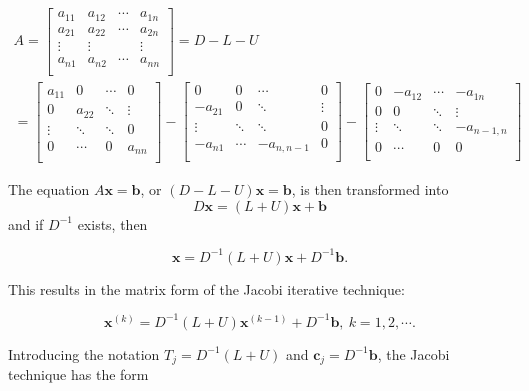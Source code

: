 \documentclass[preprint,12pt]{elsarticle}
\begin{document}
$$
\begin{array}{l}
A =\begin{bmatrix}
    a_{11} & a_{12} & \cdots & a_{1n} \\
    a_{21} & a_{22} & \cdots & a_{2n} \\
    \vdots & \vdots &  & \vdots \\
    a_{n1} & a_{n2} & \cdots & a_{nn} \\
  \end{bmatrix} =D-L-U\\
=\begin{bmatrix}
    a_{11} &0 & \cdots & 0 \\
    0 & a_{22} & \ddots & \vdots \\
    \vdots & \ddots & \ddots & 0 \\
   0 & \cdots & 0 & a_{nn} \\
  \end{bmatrix}-
  \begin{bmatrix}
    0 & 0 & \cdots & 0 \\
    -a_{21} & 0 & \ddots & \vdots \\
    \vdots & \ddots & \ddots & 0\\
    -a_{n1} &\cdots &  -a_{n,n-1} & 0 \\
  \end{bmatrix}
  -\begin{bmatrix}
    0 & -a_{12} & \cdots & -a_{1n} \\
    0 & 0 & \ddots &\vdots \\
    \vdots & \ddots & \ddots &  -a_{n-1,n} \\
    0 & \cdots & 0& 0 \\
  \end{bmatrix}
\end{array}
$$

The equation $A\mathbf{x} = \mathbf{b}$, or $(D - L - U)\mathbf{x} = \mathbf{b}$, is then transformed into \[D\mathbf{x} = (L + U)\mathbf{x} + \mathbf{b}\] and if $D^{-1}$ exists, then

$$
\mathbf{x} = D^{-1}(L + U)\mathbf{x} + D^{-1}\mathbf{b}.
$$

This results in the matrix form of the Jacobi iterative technique:

\begin{equation*}
\mathbf{x}^{(k)} = D^{-1}(L + U)\mathbf{x}^{(k-1)} +
D^{-1}\mathbf{b},\ k = 1, 2,\cdots.
\end{equation*}

Introducing the notation $T_j = D^{-1}(L + U)$ and $\mathbf{c}_j = D^{-1}\mathbf{b}$, the Jacobi technique has the form
\end{document}
